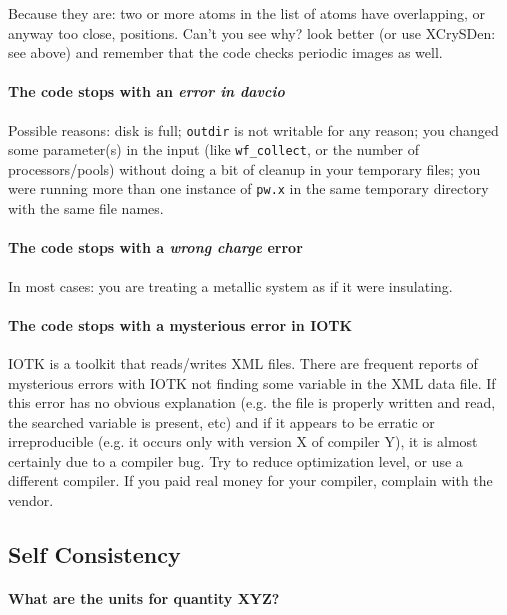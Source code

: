 \documentclass[12pt,a4paper]{article}
\begin{document}
Because they are: two or more atoms in the list of atoms have
overlapping, or anyway too close, positions. Can't you see why? look better
(or use XCrySDen: see above) and remember that the code checks periodic
images as well. 

\paragraph{The code stops with an {\em error in davcio}}

Possible reasons: disk is full; \texttt{outdir} is not writable for
any reason; you changed some parameter(s) in the input (like 
\texttt{wf\_collect}, or the number of processors/pools) without 
doing a bit of cleanup in your temporary files; you were running 
more than one instance of \texttt{pw.x} in the same temporary
directory with the same file names. 

\paragraph{The code stops with a {\em wrong charge} error}

In most cases: you are treating a metallic system
as if it were insulating.

\paragraph{The code stops with a mysterious error in IOTK}

IOTK is a toolkit that reads/writes XML files. There are frequent
reports of mysterious errors with IOTK not finding some variable
in the XML data file. If this error has no obvious explanation 
(e.g. the file is properly written and read, the searched variable
is present, etc) and if it appears to be erratic or irreproducible
(e.g. it occurs only with version X of compiler Y), it is almost
certainly due to a compiler bug. Try to reduce optimization level,
or  use a different compiler. If you paid real money for your 
compiler, complain with the vendor.

\subsection{Self Consistency}

\paragraph{What are the units for quantity XYZ?}
\end{document}
